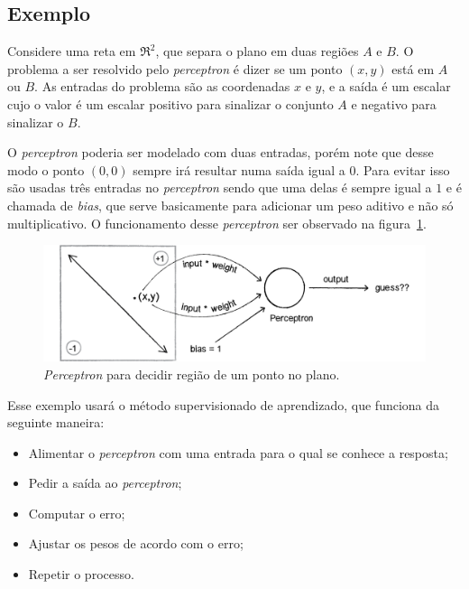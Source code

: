\subsection{Exemplo}

Considere uma reta em $\Re^2$, que separa o plano em duas regiões $A$ e $B$. O problema a
ser resolvido pelo \textit{perceptron} é dizer se um ponto $(x,y)$ está em $A$ ou $B$. As entradas do
problema são as coordenadas $x$ e $y$, e a saída é um escalar cujo o valor é um escalar positivo
para sinalizar o conjunto $A$ e negativo para sinalizar o $B$.

O \textit{perceptron} poderia ser modelado com duas entradas, porém note que desse modo o
ponto $(0,0)$ sempre irá resultar numa saída igual a $0$. Para evitar isso são usadas três entradas
no \textit{perceptron} sendo que uma delas é sempre igual a $1$ e é chamada de \emph{bias}, que serve
basicamente para adicionar um peso aditivo e não só multiplicativo. O funcionamento desse \textit{perceptron}
ser observado na figura~\ref{fig:rede_neural_simple_problem}.

\begin{figure}[ht]
\centering
\includegraphics[width=15cm]{figuras/rede_neural_simple_problem}
\caption{\textit{Perceptron} para decidir região de um ponto no plano.}\label{fig:rede_neural_simple_problem}
\end{figure}

Esse exemplo usará o método supervisionado de aprendizado, que funciona da seguinte maneira:

\begin{itemize}
\item
  Alimentar o \textit{perceptron} com uma entrada para o qual se conhece a resposta;
\item
  Pedir a saída ao \textit{perceptron};
\item
  Computar o erro;
\item
  Ajustar os pesos de acordo com o erro;
\item
  Repetir o processo.
\end{itemize}

